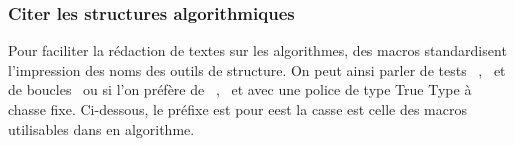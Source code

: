 \documentclass[12pt,a4paper]{article}
\begin{document}


\subsubsection{Citer les structures algorithmiques}

Pour faciliter la rédaction de textes sur les algorithmes, des macros standardisent l'impression des noms des outils de structure. On peut ainsi parler de tests \txtIf\ , \txtIfElseIfElse\ et de boucles \txtWhile\, ou si l'on préfère de \txtIf*\ , \txtIfElseIfElse*\ et \txtWhile*{} avec une police de type True Type à chasse fixe.
Ci-dessous, le préfixe  est pour  eest la casse est celle des macros utilisables dans en algorithme.


\end{document}
